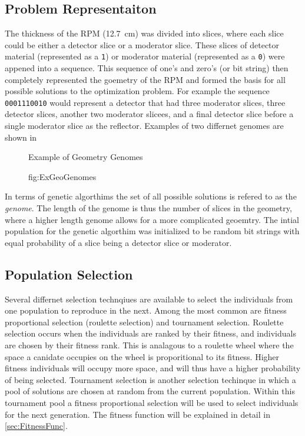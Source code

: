 \subsection{Problem Representaiton}
The thickness of the RPM  (\SI{12.7}{\cm}) was divided into slices, where each slice could be either a detector slice or a moderator slice.
These slices of detector material (represented as a \verb+1+) or moderator material (represented as a \verb+0+) were appened into a sequence.
This sequence of one's and zero's (or bit string) then completely represented the goemetry of the RPM and formed the basis for all possible solutions to the optimization problem.
For example the sequence \verb+0001110010+ would represent a detector that had three moderator slices, three detector slices, another two moderator slicees, and a final detector slice before a single moderator slice as the reflector.
Examples of two differnet genomes are shown in 
\begin{figure}

  \caption[Example Geometries Genomes]{Example of Geometry Genomes}
  \caption{fig:ExGeoGenomes}
\end{figure}
In terms of genetic algorthims the set of all possible solutions is refered to as the \textit{genome}.
The length of the genome is thus the number of slices in the geometry, where a higher length genome allows for a more complicated geoemtry.
The intial population for the genetic algorthim was initialized to be random bit strings with equal probability of a slice being a detector slice or moderator.

\subsection{Population Selection}
Several differnet selection technqiues are available to select the individuals from one population to reproduce in the next.
Among the most common are fitness proportional selection (roulette selection) and tournament selection.
Roulette selection occurs when the individuals are ranked by their fitness, and individuals are chosen by their fitness rank.
This is analagous to a roulette wheel where the space a canidate occupies on the wheel is proporitional to its fitness.
Higher fitness individuals will occupy more space, and will thus have a higher probability of being selected.
Tournament selection is another selection techinque in which a pool of solutions are chosen at random from the current population.
Within this tournament pool a fitness proportional selection will be used to select individuals for the next generation.
The fitness function will be explained in detail in \autoref{sec:FitnessFunc}.

